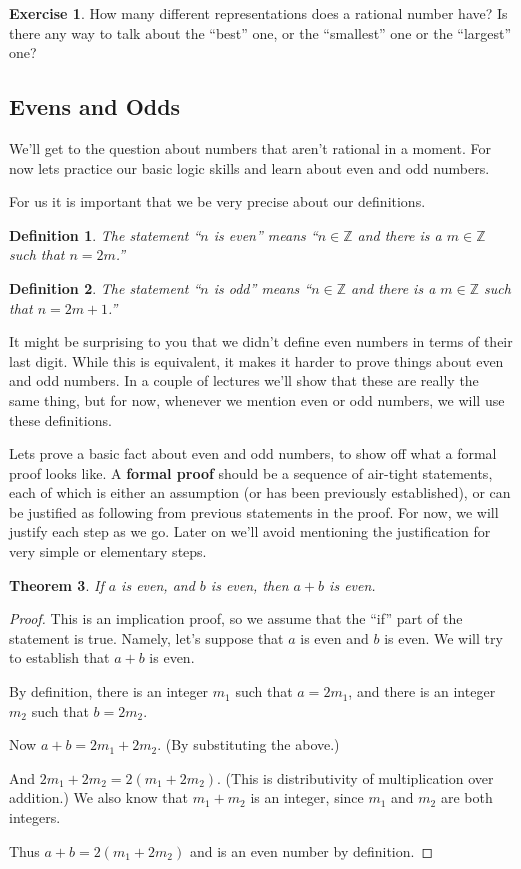 \documentclass[11pt]{article}
\newtheorem{thm}{Theorem}
\newtheorem{dfn}[thm]{Definition}
\theoremstyle{definition}
\newtheorem{exercise}{Exercise}
\numberwithin{thm}{section}
\begin{document}
\begin{exercise} How many different representations does a rational number have? Is there any way to talk about the ``best'' one, or the ``smallest'' one or the ``largest'' one?
\end{exercise}

\subsection{Evens and Odds}

We'll get to the question about numbers that aren't rational in a moment. For now lets practice our basic logic skills and learn about even and odd numbers.

For us it is important that we be very precise about our definitions.

\begin{dfn} The statement ``$n$ is even'' means ``$n \in \mathbb{Z}$ and there is a $m \in \mathbb{Z}$ such that $n = 2m$.''
\end{dfn}

\begin{dfn} The statement ``$n$ is odd'' means ``$n \in \mathbb{Z}$ and there is a $m \in \mathbb{Z}$ such that $n = 2m + 1$.''
\end{dfn}

It might be surprising to you that we didn't define even numbers in terms of their last digit. While this is equivalent, it makes it harder to prove things about even and odd numbers. In a couple of lectures we'll show that these are really the same thing, but for now, whenever we mention even or odd numbers, we will use these definitions.

Lets prove a basic fact about even and odd numbers, to show off what a formal proof looks like. A \textbf{formal proof} should be a sequence of air-tight statements, each of which is either an assumption (or has been previously established), or can be justified as following from previous statements in the proof. For now, we will justify each step as we go. Later on we'll avoid mentioning the justification for very simple or elementary steps.

\begin{thm} If $a$ is even, and $b$ is even, then $a+b$ is even.
\end{thm}

\begin{proof} This is an implication proof, so we assume that the ``if'' part of the statement is true. Namely, let's suppose that $a$ is even and $b$ is even. We will try to establish that $a+b$ is even.

By definition, there is an integer $m_1$ such that $a = 2m_1$, and there is an integer $m_2$ such that $b=2m_2$.

Now $a+b = 2m_1 + 2m_2$. (By substituting the above.)

And $2m_1 + 2m_2 = 2(m_1 + 2m_2)$. (This is distributivity of multiplication over addition.) We also know that $m_1 + m_2$ is an integer, since $m_1$ and $m_2$ are both integers.

Thus $a+b = 2(m_1 + 2m_2)$ and is an even number by definition.
\end{proof}
\end{document}
